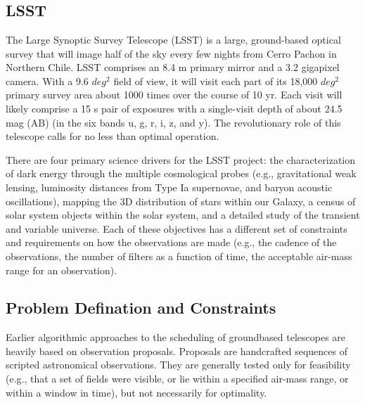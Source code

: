 \documentclass{article}
\begin{document}
\section*{\cite{naghib2019framework} }

\subsection*{LSST}

The Large Synoptic Survey Telescope (LSST) is a large,
ground-based optical survey that will image half of the sky
every few nights from Cerro Pachon in Northern Chile. LSST
comprises an 8.4 m primary mirror and a 3.2 gigapixel camera.
With a 9.6 \(deg^2\) field of view, it will visit each part of its
18,000 \(deg^2\) primary survey area about 1000 times over the
course of 10 yr. Each visit will likely comprise a 15 s pair of
exposures with a single-visit depth of about 24.5 mag (AB)
(in the six bands u, g, r, i, z, and y). The revolutionary role of
this telescope calls for no less than optimal operation.

There are four primary science drivers for the LSST project:
the characterization of dark energy through the multiple
cosmological probes (e.g., gravitational weak lensing, luminosity distances from Type Ia supernovae, and baryon acoustic
oscillations), mapping the 3D distribution of stars within our
Galaxy, a census of solar system objects within the solar
system, and a detailed study of the transient and variable
universe. Each of these objectives has a different set of
constraints and requirements on how the observations are made
(e.g., the cadence of the observations, the number of filters as a
function of time, the acceptable air-mass range for an
observation). 

\subsection*{Problem Defination and Constraints}


Earlier algorithmic approaches to the scheduling of groundbased telescopes 
are heavily based on observation proposals.
Proposals are handcrafted sequences of scripted astronomical
observations. They are generally tested only for feasibility
(e.g., that a set of fields were visible, or lie within a specified
air-mass range, or within a window in time), but not necessarily
for optimality.
\end{document}
